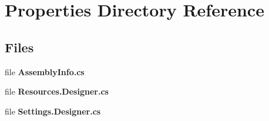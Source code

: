 \section{Properties Directory Reference}
\label{dir_d051c76eebdc544d9c3d734575641c72}
\subsection*{Files}
\begin{DoxyCompactItemize}
\item 
file \textbf{ Assembly\+Info.\+cs}
\item 
file \textbf{ Resources.\+Designer.\+cs}
\item 
file \textbf{ Settings.\+Designer.\+cs}
\end{DoxyCompactItemize}
